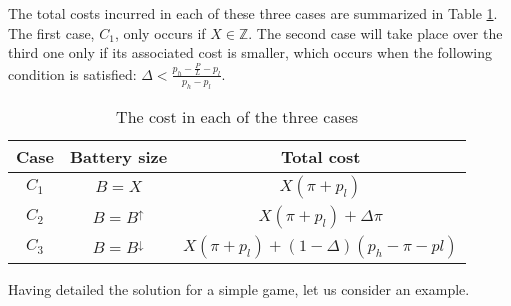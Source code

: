 \documentclass[sigconf, table]{acmart}
\begin{document}
The total costs incurred in each of these three cases are summarized in  Table \ref{tab:bat_cases}. The first case, $C_1$, only occurs if $X \in \mathbb{Z}$. The second case will take place over the third one only if its associated cost is smaller, which occurs when the following condition is satisfied: $  \Delta < \frac{p_h - \frac{P}{L} - p_l}{p_h - p_l}$.

\begin{table}[htpb]
	\centering
	\caption{The cost in each of the three cases}
	\label{tab:bat_cases}
  \begin{tabular}{c|c|c}
    Case & Battery size & Total cost \\ \hline
    \toprule
		$C_1$ & $B=X$ & $X (\pi + p_l)$ \\ \hline
		$C_2$ & $B = B^{\uparrow}$ & $X (\pi + p_l) + \Delta \pi$ \\ \hline
		$C_3$ & $B = B^{\downarrow}$ & $X (\pi + p_l) + (1-\Delta)(p_h -\pi - pl)$ \\ \hline
	\end{tabular}
\end{table}

Having detailed the solution for a simple game, let us consider an example.
\end{document}
